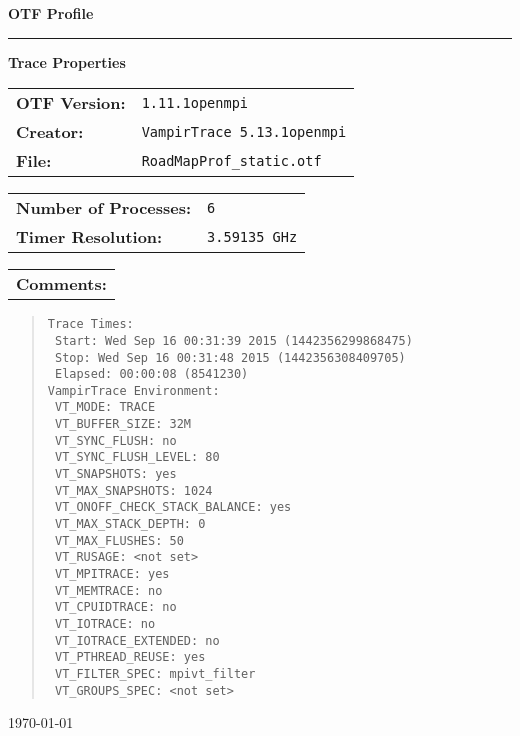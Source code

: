 \documentclass[a4paper,10pt]{article}
\begin{document}
\begin{titlepage}\thispagestyle{empty}
\begin{huge}\begin{flushleft}\bf{OTF Profile}\end{flushleft}\end{huge}
\hrule
\begin{flushright}\textbf{\large Trace Properties}\end{flushright}
\vspace{0.5\baselineskip}
\begin{flushleft}
\begin{tabular}{ll}
\bf{OTF Version:} & \verb|1.11.1openmpi| \\
\bf{Creator:} & \verb|VampirTrace 5.13.1openmpi|\\
\bf{File:} & \verb|RoadMapProf_static.otf|
\end{tabular}

\vspace{1\baselineskip}
\begin{tabular}{ll}
\bf{Number of Processes:} & \verb|6|\\
\bf{Timer Resolution:} & \verb|3.59135 GHz|
\end{tabular}

\vspace{1\baselineskip}
\begin{tabular}{l}\bf{Comments:}\end{tabular}
\begin{quote}\begin{verbatim}
Trace Times:
 Start: Wed Sep 16 00:31:39 2015 (1442356299868475)
 Stop: Wed Sep 16 00:31:48 2015 (1442356308409705)
 Elapsed: 00:00:08 (8541230)
VampirTrace Environment:
 VT_MODE: TRACE
 VT_BUFFER_SIZE: 32M
 VT_SYNC_FLUSH: no
 VT_SYNC_FLUSH_LEVEL: 80
 VT_SNAPSHOTS: yes
 VT_MAX_SNAPSHOTS: 1024
 VT_ONOFF_CHECK_STACK_BALANCE: yes
 VT_MAX_STACK_DEPTH: 0
 VT_MAX_FLUSHES: 50
 VT_RUSAGE: <not set>
 VT_MPITRACE: yes
 VT_MEMTRACE: no
 VT_CPUIDTRACE: no
 VT_IOTRACE: no
 VT_IOTRACE_EXTENDED: no
 VT_PTHREAD_REUSE: yes
 VT_FILTER_SPEC: mpivt_filter
 VT_GROUPS_SPEC: <not set>
\end{verbatim}\end{quote}
\end{flushleft}
\vspace*{\fill}
\begin{flushright}\today\end{flushright}
\end{titlepage}
\end{document}
